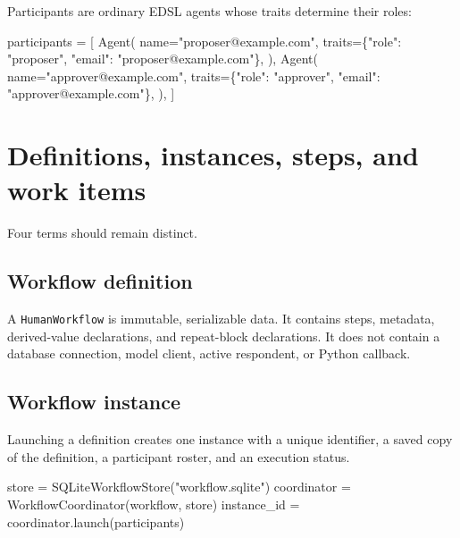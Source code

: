 \documentclass[
  10pt,
]{report}
\newenvironment{Shaded}{}{}
\newcommand{\NormalTok}[1]{#1}
\newcommand{\OperatorTok}[1]{\textcolor[rgb]{0.40,0.40,0.40}{#1}}
\newcommand{\StringTok}[1]{\textcolor[rgb]{0.25,0.44,0.63}{#1}}
\begin{document}
Participants are ordinary EDSL agents whose traits determine their
roles:

\begin{Shaded}
\begin{Highlighting}[]
\NormalTok{participants }\OperatorTok{=}\NormalTok{ [}
\NormalTok{    Agent(}
\NormalTok{        name}\OperatorTok{=}\StringTok{"proposer@example.com"}\NormalTok{,}
\NormalTok{        traits}\OperatorTok{=}\NormalTok{\{}\StringTok{"role"}\NormalTok{: }\StringTok{"proposer"}\NormalTok{, }\StringTok{"email"}\NormalTok{: }\StringTok{"proposer@example.com"}\NormalTok{\},}
\NormalTok{    ),}
\NormalTok{    Agent(}
\NormalTok{        name}\OperatorTok{=}\StringTok{"approver@example.com"}\NormalTok{,}
\NormalTok{        traits}\OperatorTok{=}\NormalTok{\{}\StringTok{"role"}\NormalTok{: }\StringTok{"approver"}\NormalTok{, }\StringTok{"email"}\NormalTok{: }\StringTok{"approver@example.com"}\NormalTok{\},}
\NormalTok{    ),}
\NormalTok{]}
\end{Highlighting}
\end{Shaded}

\chapter{Definitions, instances, steps, and work
items}\label{definitions-instances-steps-and-work-items}

Four terms should remain distinct.

\section{Workflow definition}\label{workflow-definition}

A \texttt{HumanWorkflow} is immutable, serializable data. It contains
steps, metadata, derived-value declarations, and repeat-block
declarations. It does not contain a database connection, model client,
active respondent, or Python callback.

\section{Workflow instance}\label{workflow-instance}

Launching a definition creates one instance with a unique identifier, a
saved copy of the definition, a participant roster, and an execution
status.

\begin{Shaded}
\begin{Highlighting}[]
\NormalTok{store }\OperatorTok{=}\NormalTok{ SQLiteWorkflowStore(}\StringTok{"workflow.sqlite"}\NormalTok{)}
\NormalTok{coordinator }\OperatorTok{=}\NormalTok{ WorkflowCoordinator(workflow, store)}
\NormalTok{instance\_id }\OperatorTok{=}\NormalTok{ coordinator.launch(participants)}
\end{Highlighting}
\end{Shaded}
\end{document}
